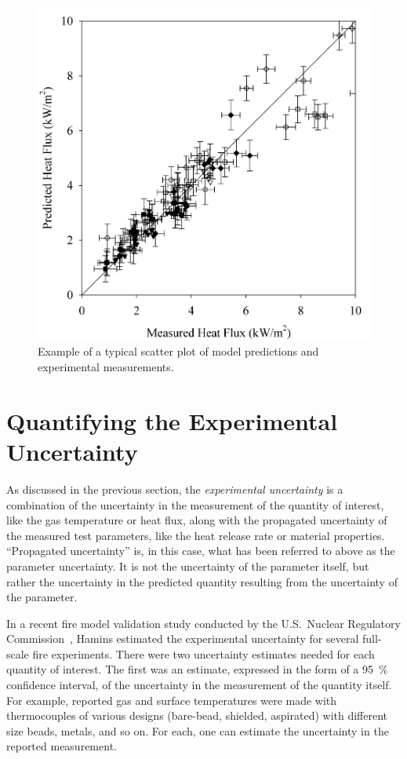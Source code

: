 \begin{figure}[ht]
\begin{center}
\includegraphics[height=3.in]{FIGURES/scatterplot}
\end{center}
\caption[Sample scatter plot.]{Example of a typical scatter plot of model predictions and experimental measurements.}
\label{scatterplot}
\end{figure}


\section{Quantifying the Experimental Uncertainty}

As discussed in the previous section, the {\em experimental uncertainty} is a combination of the uncertainty
in the measurement of the quantity of interest, like the gas temperature or heat flux, along with the propagated
uncertainty of the measured test parameters, like the heat release rate or material properties.
``Propagated uncertainty'' is, in this case, what has been referred to above as the parameter uncertainty.
It is not the uncertainty of the parameter itself, but rather the uncertainty in the predicted quantity
resulting from the uncertainty of the parameter.

In a recent fire model validation study conducted by the U.S.~Nuclear Regulatory Commission~\cite{NUREG_1824},
Hamins estimated the experimental uncertainty for several full-scale fire experiments. There were
two uncertainty estimates needed for each quantity of interest. The first was an estimate, expressed in the
form of a 95~\% confidence interval, of the
uncertainty in the measurement of the quantity itself. For example, reported gas and surface temperatures
were made with thermocouples of various designs (bare-bead,
shielded, aspirated) with different size beads, metals, and so on. For each, one can estimate the
uncertainty in the reported measurement.


